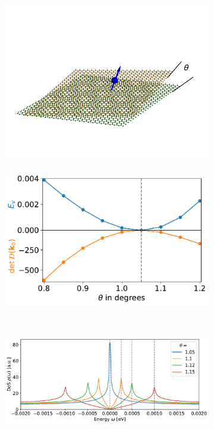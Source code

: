 \begin{figure}[t!]
	\begin{subfigure}[b]{0.47\linewidth}
		\centering
		\includegraphics[width=1\linewidth]{figures/chapter2/Kondo_impurity_on_twisted_bilayer_3.pdf}
		\caption{\centering\label{fig:schematic}}
	\end{subfigure}
	\begin{subfigure}[b]{0.47\linewidth}
		\centering
		\includegraphics[width=\linewidth]{figures/chapter2/ShowHigherOrder.pdf}
		\caption{\centering{\label{fig:ShowHigherOrder}}}
	\end{subfigure}\\
	\begin{subfigure}[b]{\linewidth}
		\centering
		\includegraphics[width=\linewidth]{figures/chapter2/BiggerFontHistogramDOS.pdf}

\end{subfigure}
\end{figure}
